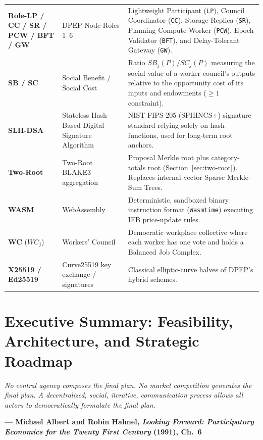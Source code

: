 \documentclass[10pt,twoside,openany]{book}
\makeatletter
\theoremstyle{dpepstyle}
\newcommand{\chapterepigraph}[2]{%
  \vspace{-0.4em}
  \begin{FlushRight}
  \begin{minipage}{0.82\textwidth}
    \itshape\small\color{SlateDark} #1\par
    \vspace{3pt}
    \upshape\footnotesize\textbf{--- #2}
  \end{minipage}
  \end{FlushRight}
  \vspace{1em}
}
\newenvironment{FlushRight}{\begin{flushright}}{\end{flushright}}
\renewcommand{\mainmatter}{\clearpage\@mainmattertrue\pagenumbering{arabic}}
\makeatother
\begin{document}
{\begin{longtable}{L{0.92in} L{1.75in} L{1.95in}}
\textbf{Role-LP / CC / SR / PCW / BFT / GW} & DPEP Node Roles 1--6 & Lightweight Participant (\texttt{LP}), Council Coordinator (\texttt{CC}), Storage Replica (\texttt{SR}), Planning Compute Worker (\texttt{PCW}), Epoch Validator (\texttt{BFT}), and Delay-Tolerant Gateway (\texttt{GW}). \\
\textbf{SB / SC} & Social Benefit / Social Cost & Ratio $SB_j(P)/SC_j(P)$ measuring the social value of a worker council's outputs relative to the opportunity cost of its inputs and endowments ($\ge 1$ constraint). \\
\textbf{SLH-DSA} & Stateless Hash-Based Digital Signature Algorithm & NIST FIPS 205 (SPHINCS+) signature standard relying solely on hash functions, used for long-term root anchors. \\
\textbf{Two-Root} & Two-Root BLAKE3 aggregation & Proposal Merkle root plus category-totals root (Section~\ref{sec:two-root}). Replaces internal-vector Sparse Merkle-Sum Trees. \\
\textbf{WASM} & WebAssembly & Deterministic, sandboxed binary instruction format (\texttt{Wasmtime}) executing IFB price-update rules. \\
\textbf{WC} ($WC_j$) & Workers' Council & Democratic workplace collective where each worker has one vote and holds a Balanced Job Complex. \\
\textbf{X25519 / Ed25519} & Curve25519 key exchange / signatures & Classical elliptic-curve halves of DPEP's hybrid schemes. \\
\end{longtable}}
\clearpage

\mainmatter

\chapter{Executive Summary: Feasibility, Architecture, and Strategic Roadmap}
\label{ch:exec}

\chapterepigraph{No central agency composes the final plan. No market competition generates the final plan. A decentralized, social, iterative, communication process allows all actors to democratically formulate the final plan.}{Michael Albert and Robin Hahnel, \emph{Looking Forward: Participatory Economics for the Twenty First Century} (1991), Ch.~6\protect\footnotemark}
\end{document}

